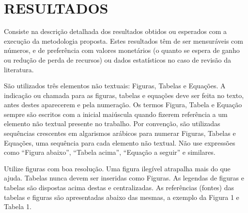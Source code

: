 
\chapter{RESULTADOS} %
\label{resultados}

Consiste na descrição detalhada dos resultados obtidos ou esperados com a execução da metodologia proposta. Estes resultados têm de ser mensuráveis com números, e de preferência com valores monetários (o quanto se espera de ganho ou redução de perda de recursos) ou dados estatísticos no caso de revisão da literatura.

São utilizados três elementos não textuais: Figuras, Tabelas e Equações. A indicação ou chamada para as figuras, tabelas e equações deve ser feita no texto, antes destes aparecerem e pela numeração. Os termos Figura, Tabela e Equação sempre são escritos com a inicial maiúscula quando fizerem referência a um elemento não textual presente no trabalho. Por convenção, são utilizadas sequências crescentes em algarismos arábicos para numerar Figuras, Tabelas e Equações, uma sequência para cada elemento não textual. Não use expressões como “Figura abaixo”, “Tabela acima”, “Equação a seguir” e similares.

Utilize figuras com boa resolução. Uma figura ilegível atrapalha mais do que ajuda. Tabelas nunca devem ser inseridas como Figuras. As legendas de figuras e tabelas são dispostas acima destas e centralizadas. As referências (fontes) das tabelas e figuras são apresentadas abaixo das mesmas, a exemplo da Figura 1 e Tabela 1. 